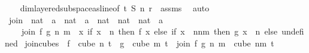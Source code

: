 \begin{isabellebody}
%
\isadelimproof
\ \ %
\endisadelimproof
%
\isatagproof
{}\isamarkupfalse%
\ dim{}{\isacharunderscore}{\kern0pt}layered{\isacharunderscore}{\kern0pt}subspace{\isacharunderscore}{\kern0pt}as{\isacharunderscore}{\kern0pt}line{\isacharbrackleft}{\kern0pt}of\ t\ S\ n\ r\ {\isasymchi}{\isacharbrackright}{\kern0pt}\ assms\ \isamarkupfalse%
\ auto%
\endisatagproof
{\isafoldproof}%
%
\isadelimproof
\ \ \isanewline
%
\endisadelimproof
\isanewline
{}\isamarkupfalse%
\ join\ {\isacharcolon}{\kern0pt}{\isacharcolon}{\kern0pt}\ {\isachardoublequoteopen}{\isacharparenleft}{\kern0pt}nat\ {\isasymRightarrow}\ {\isacharprime}{\kern0pt}a{\isacharparenright}{\kern0pt}\ {\isasymRightarrow}\ {\isacharparenleft}{\kern0pt}nat\ {\isasymRightarrow}\ {\isacharprime}{\kern0pt}a{\isacharparenright}{\kern0pt}\ {\isasymRightarrow}\ nat\ {\isasymRightarrow}\ nat\ {\isasymRightarrow}\ {\isacharparenleft}{\kern0pt}nat\ {\isasymRightarrow}\ {\isacharprime}{\kern0pt}a{\isacharparenright}{\kern0pt}{\isachardoublequoteclose}\isanewline
\ \ \isanewline
\ \ \ \ {\isachardoublequoteopen}join\ f\ g\ n\ m\ {\isasymequiv}\ {\isacharparenleft}{\kern0pt}{\isasymlambda}x{\isachardot}{\kern0pt}\ if\ x\ {\isasymin}\ {\isacharbraceleft}{\kern0pt}{\isachardot}{\kern0pt}{\isachardot}{\kern0pt}{\isacharless}{\kern0pt}n{\isacharbraceright}{\kern0pt}\ then\ f\ x\ else\ {\isacharparenleft}{\kern0pt}if\ x\ {\isasymin}\ {\isacharbraceleft}{\kern0pt}n{\isachardot}{\kern0pt}{\isachardot}{\kern0pt}{\isacharless}{\kern0pt}n{\isacharplus}{\kern0pt}m{\isacharbraceright}{\kern0pt}\ then\ g\ {\isacharparenleft}{\kern0pt}x\ {\isacharminus}{\kern0pt}\ n{\isacharparenright}{\kern0pt}\ else\ undefined{\isacharparenright}{\kern0pt}{\isacharparenright}{\kern0pt}{\isachardoublequoteclose}\isanewline
\isanewline
{}\isamarkupfalse%
\ join{\isacharunderscore}{\kern0pt}cubes{\isacharcolon}{\kern0pt}\ \ {\isachardoublequoteopen}f\ {\isasymin}\ cube\ n\ {\isacharparenleft}{\kern0pt}t{\isacharplus}{\kern0pt}{}{\isacharparenright}{\kern0pt}{\isachardoublequoteclose}\ \ {\isachardoublequoteopen}g\ {\isasymin}\ cube\ m\ {\isacharparenleft}{\kern0pt}t{\isacharplus}{\kern0pt}{}{\isacharparenright}{\kern0pt}{\isachardoublequoteclose}\ \ {\isachardoublequoteopen}join\ f\ g\ n\ m\ {\isasymin}\ cube\ {\isacharparenleft}{\kern0pt}n{\isacharplus}{\kern0pt}m{\isacharparenright}{\kern0pt}\ {\isacharparenleft}{\kern0pt}t{\isacharplus}{\kern0pt}{}{\isacharparenright}{\kern0pt}{\isachardoublequoteclose}\isanewline

\end{isabellebody}
